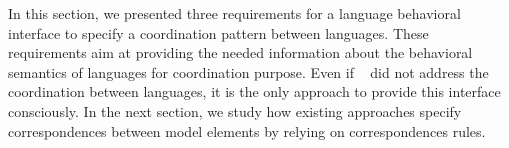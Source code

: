 {%

In this section, we presented three requirements for a language behavioral interface to specify a coordination pattern between languages. These requirements aim at providing the needed information about the behavioral semantics of languages for coordination purpose. Even if ~\cite{sle13-combemale} did not address the coordination between languages, it is the only approach to provide this interface consciously. In the next section, we study how existing approaches specify correspondences between model elements by relying on correspondences rules.

	    	
	    	
	    				
	    				
	    				
	    				
}
